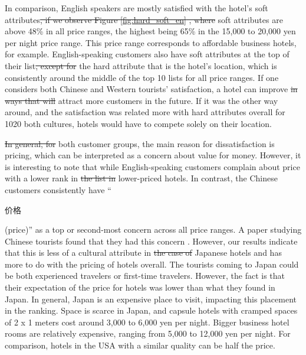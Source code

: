 \documentclass[smallextended,natbib]{svjour3}       %
\providecommand{\DIFadd}[1]{{\protect\color{blue}\uwave{#1}}} %
\providecommand{\DIFdel}[1]{{\protect\color{red}\sout{#1}}}                      %
\providecommand{\DIFaddbegin}{} %
\providecommand{\DIFaddend}{} %
\providecommand{\DIFdelbegin}{} %
\providecommand{\DIFdelend}{} %
\newcommand{\DIFscaledelfig}{0.5}
\newlength{\DIFdelgraphicswidth} %
\newlength{\DIFdelgraphicsheight} %
\newcommand{\DIFaddincludegraphics}[2][]{{\color{blue}\fbox{\DIFOincludegraphics[#1]{#2}}}} %
\newcommand{\DIFdelincludegraphics}[2][]{%
\sbox{\DIFdelgraphicsbox}{\DIFOincludegraphics[#1]{#2}}%
\settoboxwidth{\DIFdelgraphicswidth}{\DIFdelgraphicsbox} %
\settoboxtotalheight{\DIFdelgraphicsheight}{\DIFdelgraphicsbox} %
\scalebox{\DIFscaledelfig}{%
\parbox[b]{\DIFdelgraphicswidth}{\usebox{\DIFdelgraphicsbox}\\[-\baselineskip] \rule{\DIFdelgraphicswidth}{0em}}\llap{\resizebox{\DIFdelgraphicswidth}{\DIFdelgraphicsheight}{%
\setlength{\unitlength}{\DIFdelgraphicswidth}%
\begin{picture}(1,1)%
\thicklines\linethickness{2pt} %
{\color[rgb]{1,0,0}\put(0,0){\framebox(1,1){}}}%
{\color[rgb]{1,0,0}\put(0,0){\line( 1,1){1}}}%
{\color[rgb]{1,0,0}\put(0,1){\line(1,-1){1}}}%
\end{picture}%
}\hspace*{3pt}}} %
} %
\DeclareRobustCommand{\DIFaddbegin}{\DIFOaddbegin \let\includegraphics\DIFaddincludegraphics} %
\DeclareRobustCommand{\DIFaddend}{\DIFOaddend \let\includegraphics\DIFOincludegraphics} %
\DeclareRobustCommand{\DIFdelbegin}{\DIFOdelbegin \let\includegraphics\DIFdelincludegraphics} %
\DeclareRobustCommand{\DIFdelend}{\DIFOaddend \let\includegraphics\DIFOincludegraphics} %
\begin{document}
    In comparison, English speakers are mostly satisfied with the hotel's soft attributes\DIFdelbegin \DIFdel{, if we observe Figure \ref{fig:hard_soft_en} , where }\DIFdelend \DIFaddbegin \DIFadd{. Figure \ref{fig:hard_soft_en} shows that }\DIFaddend soft attributes are above 48\% in all price ranges, the highest being 65\% in the 15,000 to 20,000 yen per night price range. This price range corresponds to affordable business hotels, for example. English-speaking customers also have soft attributes at the top of their list\DIFdelbegin \DIFdel{, except for }\DIFdelend \DIFaddbegin \DIFadd{. The exception is }\DIFaddend the hard attribute that is the hotel's location, which is consistently around the middle of the top 10 lists for all price ranges. If one considers both Chinese and Western tourists’ satisfaction, a hotel can improve \DIFdelbegin \DIFdel{in ways that will }\DIFdelend \DIFaddbegin \DIFadd{to }\DIFaddend attract more customers in the future. If it was the other way around, and the satisfaction was related more with hard attributes overall for 1020 both cultures, hotels would have to compete solely on their location.

    \DIFdelbegin \DIFdel{In general, for }\DIFdelend \DIFaddbegin \DIFadd{For }\DIFaddend both customer groups, the main reason for dissatisfaction is pricing, which can be interpreted as a concern about value for money. However, it is interesting to note that while English-speaking customers complain about price with a lower rank in \DIFdelbegin \DIFdel{the list in }\DIFdelend lower-priced hotels. In contrast, the Chinese customers consistently have ``\begin{CJK}{UTF8}{gbsn}价格\end{CJK} (price)'' as a top or second-most concern across all price ranges. A paper studying Chinese tourists found that they had this concern \cite[][]{truong2009}. However, our results indicate that this is less of a cultural attribute in \DIFdelbegin \DIFdel{the case of }\DIFdelend Japanese hotels and has more to do with the pricing of hotels overall. The tourists coming to Japan could be both experienced travelers or first-time travelers. However, the fact is that their expectation of the price for hotels was lower than what they found in Japan. In general, Japan is an expensive place to visit, impacting this placement in the ranking. Space is scarce in Japan, and capsule hotels with cramped spaces of 2 x 1 meters cost around 3,000 to 6,000 yen per night. Bigger business hotel rooms are relatively expensive, ranging from 5,000 to 12,000 yen per night. For comparison, hotels in the USA with a similar quality can be half the price.
\end{document}
